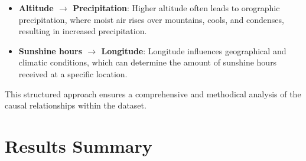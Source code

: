\documentclass{article}
\begin{document}
\begin{itemize}
    \item \textbf{Altitude $\rightarrow$ Precipitation}: Higher altitude often leads to orographic precipitation, where moist air rises over mountains, cools, and condenses, resulting in increased precipitation.
    
    \item \textbf{Sunshine hours $\rightarrow$ Longitude}: Longitude influences geographical and climatic conditions, which can determine the amount of sunshine hours received at a specific location.
\end{itemize}

This structured approach ensures a comprehensive and methodical analysis of the causal relationships within the dataset.

\section{Results Summary}
\end{document}

